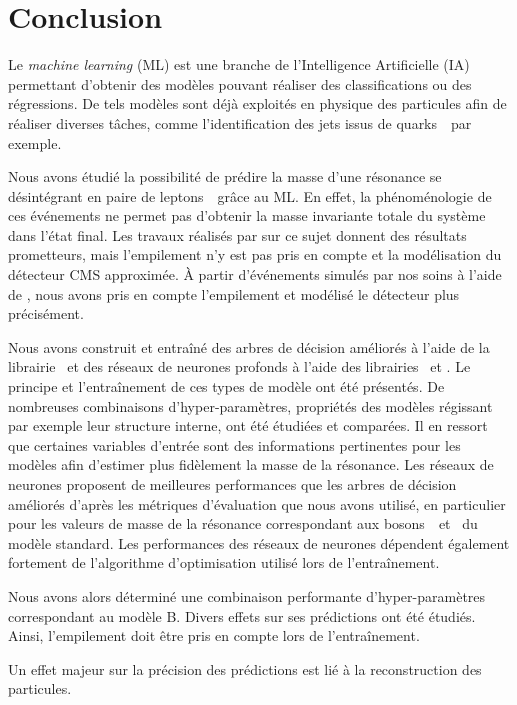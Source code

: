 \section{Conclusion}\label{chapter-ML-section-conclusion}
Le \emph{machine learning} (ML) est une branche de l'Intelligence Artificielle (IA)
permettant d'obtenir des modèles pouvant réaliser des classifications ou des régressions.
De tels modèles sont déjà exploités en physique des particules afin de réaliser diverses tâches,
comme l'identification des jets issus de quarks~\quarkb\ par exemple.
\par
Nous avons étudié la possibilité de prédire la masse d'une résonance se désintégrant en paire de leptons~\tau\ grâce au ML.
En effet, la phénoménologie de ces événements ne permet pas d'obtenir la masse invariante totale du système dans l'état final.
Les travaux réalisés par \citeauthor{BARTSCHI201929} sur ce sujet donnent des résultats prometteurs,
mais l'empilement n'y est pas pris en compte et la modélisation du détecteur CMS approximée.
À partir d'événements simulés par nos soins à l'aide de \FASTSIM,
nous avons pris en compte l'empilement et modélisé le détecteur plus précisément.
\par
Nous avons construit et entraîné
des arbres de décision améliorés
à l'aide de la librairie \XGBOOST\
et
des réseaux de neurones profonds
à l'aide des librairies \KERAS\ et \TENSORFLOW.
Le principe et l'entraînement de ces types de modèle ont été présentés.
De nombreuses combinaisons d'hyper-paramètres,
propriétés des modèles régissant par exemple leur structure interne,
ont été étudiées et comparées.
Il en ressort que certaines variables d'entrée sont des informations pertinentes pour les modèles
afin d'estimer plus fidèlement la masse de la résonance.
Les réseaux de neurones
proposent de meilleures performances que
les arbres de décision améliorés
d'après les métriques d'évaluation que nous avons utilisé,
en particulier pour les valeurs de masse de la résonance correspondant aux bosons~\Zboson\ et \higgs\ du modèle standard.
Les performances des réseaux de neurones dépendent également fortement de l'algorithme d'optimisation utilisé lors de l'entraînement.
\par
Nous avons alors déterminé une combinaison performante d'hyper-paramètres correspondant au modèle B.
Divers effets sur ses prédictions ont été étudiés.
Ainsi, l'empilement doit être pris en compte lors de l'entraînement.
\par
Un effet majeur sur la précision des prédictions est lié à la reconstruction des particules.
